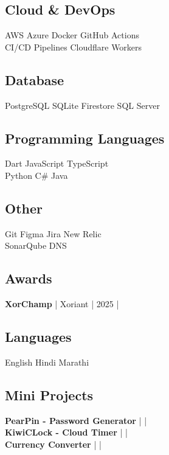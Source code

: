 \documentclass[]{deedy-resume-reversed}
\begin{document}
\begin{minipage}[t]{0.33\textwidth}
\subsection{Cloud \& DevOps}
AWS \textbullet Azure \textbullet Docker \textbullet GitHub Actions \\
CI/CD Pipelines \textbullet Cloudflare Workers \\
\sectionsep

\subsection{Database}
PostgreSQL \textbullet SQLite \textbullet Firestore \textbullet SQL Server \\
\sectionsep

\subsection{Programming Languages}
Dart \textbullet JavaScript \textbullet TypeScript \\
Python \textbullet C\# \textbullet Java \\ 
\sectionsep

\subsection{Other}
Git \textbullet Figma \textbullet Jira \textbullet New Relic\\
SonarQube \textbullet DNS \\
\sectionsep

\subsection{Awards}
\textbf{XorChamp} | Xoriant | 2025  | 
\href{https://github.com/sunnydodti/resume/blob/main/awards/XorChamp%20-%20Sunny%20Dodti.pdf}{\faExternalLink } 
\sectionsep

\subsection{Languages}
English \textbullet Hindi \textbullet Marathi \\
\sectionsep

\subsection{Mini Projects}

\textbf{PearPin - Password Generator} | \href{https://github.com/sunnydodti/pearpin}{\faGithub} | \href{https://pearpin.persist.site}{\faExternalLink} \\

\textbf{KiwiCLock - Cloud Timer} | \href{https://github.com/sunnydodti/kiwiclock}{\faGithub} | \href{https://kiwiclock.persist.site}{\faExternalLink} \\

\textbf{Currency Converter} | \href{https://github.com/sunnydodti/currency_converter}{\faGithub} | \href{https://sunnydodti.github.io/currency_converter}{\faExternalLink}
\sectionsep

\end{minipage}
\end{document}
